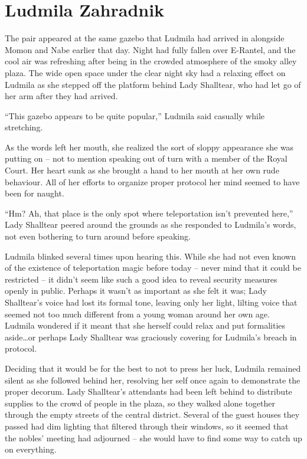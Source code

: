 \chapter{Ludmila Zahradnik}

The pair appeared at the same gazebo that Ludmila had arrived in alongside Momon and Nabe earlier that day. Night had fully fallen over E-Rantel, and the cool air was refreshing after being in the crowded atmosphere of the smoky alley plaza. The wide open space under the clear night sky had a relaxing effect on Ludmila as she stepped off the platform behind Lady Shalltear, who had let go of her arm after they had arrived.

 

“This gazebo appears to be quite popular,” Ludmila said casually while stretching.

 

As the words left her mouth, she realized the sort of sloppy appearance she was putting on – not to mention speaking out of turn with a member of the Royal Court. Her heart sunk as she brought a hand to her mouth at her own rude behaviour. All of her efforts to organize proper protocol her mind seemed to have been for naught.

 

“Hm? Ah, that place is the only spot where teleportation isn’t prevented here,” Lady Shalltear peered around the grounds as she responded to Ludmila’s words, not even bothering to turn around before speaking.

 

Ludmila blinked several times upon hearing this. While she had not even known of the existence of teleportation magic before today – never mind that it could be restricted – it didn’t seem like such a good idea to reveal security measures openly in public. Perhaps it wasn’t as important as she felt it was; Lady Shalltear’s voice had lost its formal tone, leaving only her light, lilting voice that seemed not too much different from a young woman around her own age. Ludmila wondered if it meant that she herself could relax and put formalities aside…or perhaps Lady Shalltear was graciously covering for Ludmila’s breach in protocol.

 

Deciding that it would be for the best to not to press her luck, Ludmila remained silent as she followed behind her, resolving her self once again to demonstrate the proper decorum. Lady Shalltear’s attendants had been left behind to distribute supplies to the crowd of people in the plaza, so they walked alone together through the empty streets of the central district. Several of the guest houses they passed had dim lighting that filtered through their windows, so it seemed that the nobles’ meeting had adjourned – she would have to find some way to catch up on everything.

